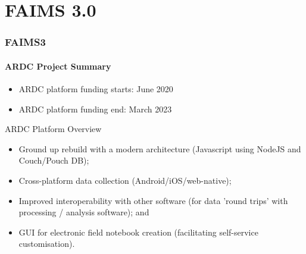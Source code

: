 

\section{FAIMS 3.0}

\begin{sectionframe} %
	\frametitle{FAIMS3}
	\framesubtitle{ARDC Project Summary}

\begin{itemize}
    \item ARDC platform funding starts: June 2020
    \item ARDC platform funding end: March 2023
\end{itemize}



\end{sectionframe}



\closingslide %



\begin{frame}{ARDC Platform Overview}

\begin{itemize}
    \item Ground up rebuild with a modern architecture (Javascript using NodeJS and Couch/Pouch DB);
    \item Cross-platform data collection (Android/iOS/web-native); 
    \item Improved interoperability with other software (for data 'round trips' with processing / analysis software); and
    \item GUI for electronic field notebook creation (facilitating self-service customisation).
\end{itemize}

\end{frame}


